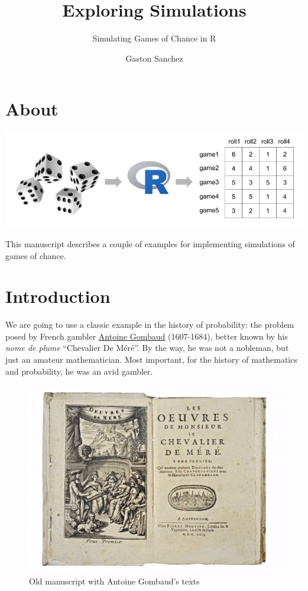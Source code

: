 \documentclass[
]{book}
\title{Exploring Simulations}
\subtitle{Simulating Games of Chance in R}
\author{Gaston Sanchez}
\date{}
\begin{document}
\maketitle

{
\setcounter{tocdepth}{1}
\tableofcontents
}
\hypertarget{about}{%
\chapter*{About}\label{about}}

\begin{center}\includegraphics[width=0.9\linewidth]{images/demere-cover} \end{center}

This manuscript describes a couple of examples for implementing simulations
of games of chance.

\hypertarget{introduction}{%
\chapter{Introduction}\label{introduction}}

We are going to use a classic example in the history of probability: the
problem posed by French gambler
\href{https://en.wikipedia.org/wiki/Antoine_Gombaud}{Antoine Gombaud} (1607-1684),
better known by his \emph{nome de plume} ``Chevalier De Méré''. By the way, he was not
a nobleman, but just an amateur mathematician. Most important, for the history
of mathematics and probability, he was an avid gambler.

\begin{figure}

{\centering \includegraphics[width=0.6\linewidth]{images/les-ouvres-de-chevalier-demere} 

}

\caption{Old manuscript with Antoine Gombaud's texts}\label{fig:unnamed-chunk-2}
\end{figure}
\end{document}
